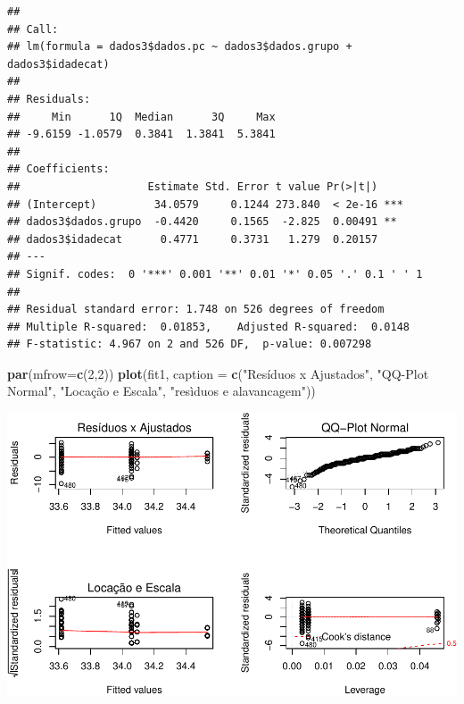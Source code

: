 \documentclass[11pt,]{article}
\makeatletter
\newenvironment{Shaded}{\begin{snugshade}}{\end{snugshade}}
\newcommand{\KeywordTok}[1]{\textcolor[rgb]{0.13,0.29,0.53}{\textbf{{#1}}}}
\newcommand{\DataTypeTok}[1]{\textcolor[rgb]{0.13,0.29,0.53}{{#1}}}
\newcommand{\DecValTok}[1]{\textcolor[rgb]{0.00,0.00,0.81}{{#1}}}
\newcommand{\StringTok}[1]{\textcolor[rgb]{0.31,0.60,0.02}{{#1}}}
\newcommand{\NormalTok}[1]{{#1}}
\def\maxwidth{\ifdim\Gin@nat@width>\linewidth\linewidth
\else\Gin@nat@width\fi}
\let\Oldincludegraphics\includegraphics
\renewcommand{\includegraphics}[1]{\Oldincludegraphics[width=\maxwidth]{#1}}
\makeatother
\begin{document}
\begin{Shaded}
\end{Shaded}

\begin{verbatim}
## 
## Call:
## lm(formula = dados3$dados.pc ~ dados3$dados.grupo + dados3$idadecat)
## 
## Residuals:
##     Min      1Q  Median      3Q     Max 
## -9.6159 -1.0579  0.3841  1.3841  5.3841 
## 
## Coefficients:
##                    Estimate Std. Error t value Pr(>|t|)    
## (Intercept)         34.0579     0.1244 273.840  < 2e-16 ***
## dados3$dados.grupo  -0.4420     0.1565  -2.825  0.00491 ** 
## dados3$idadecat      0.4771     0.3731   1.279  0.20157    
## ---
## Signif. codes:  0 '***' 0.001 '**' 0.01 '*' 0.05 '.' 0.1 ' ' 1
## 
## Residual standard error: 1.748 on 526 degrees of freedom
## Multiple R-squared:  0.01853,    Adjusted R-squared:  0.0148 
## F-statistic: 4.967 on 2 and 526 DF,  p-value: 0.007298
\end{verbatim}

\begin{Shaded}
\begin{Highlighting}[]
\KeywordTok{par}\NormalTok{(}\DataTypeTok{mfrow=}\KeywordTok{c}\NormalTok{(}\DecValTok{2}\NormalTok{,}\DecValTok{2}\NormalTok{))}
\KeywordTok{plot}\NormalTok{(fit1, }\DataTypeTok{caption =} \KeywordTok{c}\NormalTok{(}\StringTok{"Resíduos x Ajustados"}\NormalTok{, }\StringTok{"QQ-Plot Normal"}\NormalTok{,}
                       \StringTok{"Locação e Escala"}\NormalTok{, }\StringTok{"resìduos e alavancagem"}\NormalTok{))}
\end{Highlighting}
\end{Shaded}

\includegraphics{versaofinal_lista3_files/figure-latex/unnamed-chunk-17-1.pdf}
\end{document}
